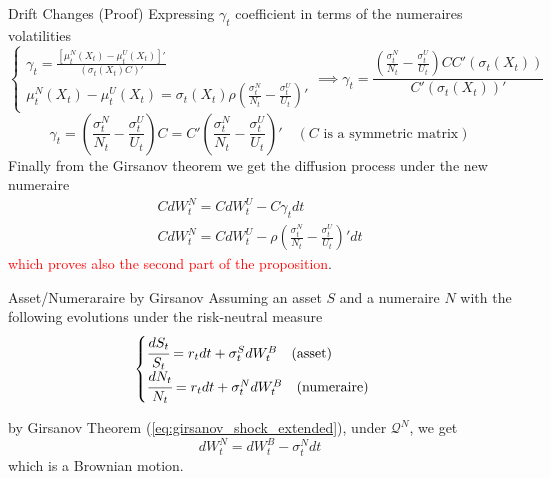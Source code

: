 \documentclass{beamer}
\begin{document}
\begin{frame}{Drift Changes (Proof)}
  Expressing $\gamma_t$ coefficient in terms of the numeraires volatilities
  \begin{equation*}
    \begin{cases}
      \gamma_t = \frac{[\mu_t^N(X_t) - \mu_t^U(X_t)]'}{(\sigma_t(X_t)C)'}\\
      \mu_t^N(X_t) - \mu_t^U(X_t) = \sigma_t(X_t)\rho \left(\frac{\sigma^N_t}{N_t} - \frac{\sigma^U_t}{U_t}\right)'
    \end{cases}\implies \gamma_t = \frac{\left(\frac{\sigma^N_t}{N_t} - \frac{\sigma^U_t}{U_t}\right)CC'(\sigma_t(X_t))}{C'(\sigma_t(X_t))'}
  \end{equation*}
  \begin{equation}
    \gamma_t = \left(\frac{\sigma^N_t}{N_t} - \frac{\sigma^U_t}{U_t}\right)C = C'\left(\frac{\sigma^N_t}{N_t} - \frac{\sigma^U_t}{U_t}\right)'\quad(\text{$C$ is a symmetric matrix})    
    \label{eq:gamma_3}
  \end{equation}
	\pause
  Finally from the Girsanov theorem we get the diffusion process under the new numeraire
  \begin{equation}
    \begin{gathered}
      CdW^N_t = CdW^U_t - C\gamma_t dt \\
      CdW^N_t = CdW^U_t - \rho\left(\frac{\sigma^N_t}{N_t}-\frac{\sigma^U_t}{U_t}\right)' dt
    \end{gathered}
	\label{eq:girsanov_shock_extended}
  \end{equation}
  \textcolor{red}{which proves also the second part of the proposition}.
  
\end{frame}

\begin{frame}{Asset/Numeraraire by Girsanov}
  Assuming an asset $S$ and a numeraire $N$ with the following evolutions under the risk-neutral measure
  \begin{equation}
    \begin{cases}
      \cfrac{dS_t}{S_t} = r_tdt + \sigma^S_t dW^B_t\quad\text{(asset)} \\
      \cfrac{dN_t}{N_t} = r_tdt + \sigma^N_t dW^B_t\quad\text{(numeraire)}
    \end{cases}
    \label{eq:S_N_dynamics}
  \end{equation}
  
  by Girsanov Theorem (\cref{eq:girsanov_shock_extended}), under $\mathcal{Q}^N$, we get
  \begin{equation}
    dW^N_t = dW_t^B - \sigma_t^N dt
    \label{eq:girsanov_ex}
  \end{equation}
  which is a Brownian motion.
\end{frame}
\end{document}
